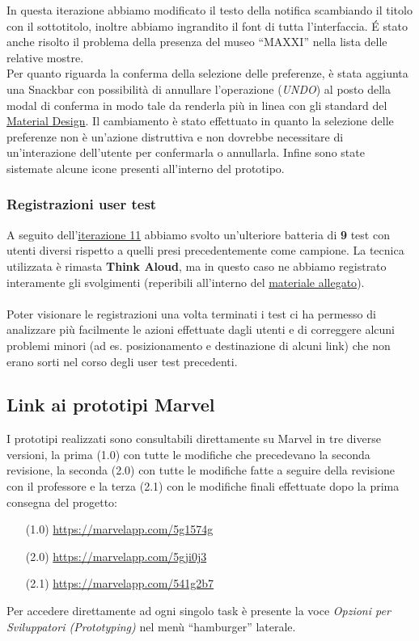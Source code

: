 In questa iterazione abbiamo modificato il testo della notifica scambiando il titolo con il sottotitolo, inoltre abbiamo ingrandito il font di tutta l'interfaccia. 
É stato anche risolto il problema della presenza del museo ``MAXXI'' nella lista delle relative mostre.\\
Per quanto riguarda la conferma della selezione delle preferenze, è stata aggiunta una Snackbar con possibilità di annullare l'operazione (\textit{UNDO}) al posto della modal di conferma in modo tale da renderla più in linea con gli standard del \href{https://material.io/components/snackbars}{Material Design}. Il cambiamento è stato effettuato in quanto la selezione delle preferenze non è un'azione distruttiva e non dovrebbe necessitare di un'interazione dell'utente per confermarla o annullarla. Infine sono state sistemate alcune icone presenti all'interno del prototipo.


\subsubsection{Registrazioni user test}
A seguito dell'\hyperref[iterazione11]{iterazione 11} abbiamo svolto un'ulteriore batteria di \textbf{9} test con utenti diversi rispetto a quelli presi precedentemente come campione. La tecnica utilizzata è rimasta \textbf{Think Aloud}, ma in questo caso ne abbiamo registrato interamente gli svolgimenti (reperibili all'interno del \href{https://github.com/andrea-gasparini/progetto-interazione-uomo-macchina/tree/master/Prototyping/Versione\%202.1/Registrazioni\%20Video}{materiale allegato}).

\paragraph{}
Poter visionare le registrazioni una volta terminati i test ci ha permesso di analizzare più facilmente le azioni effettuate dagli utenti e di correggere alcuni problemi minori (ad es. posizionamento e destinazione di alcuni link) che non erano sorti nel corso degli user test precedenti.

\subsection{Link ai prototipi Marvel}
I prototipi realizzati sono consultabili direttamente su Marvel in tre diverse versioni, la prima (1.0) con tutte le modifiche che precedevano la seconda revisione, la seconda (2.0) con tutte le modifiche fatte a seguire della revisione con il professore e la terza (2.1) con le modifiche finali effettuate dopo la prima consegna del progetto:
\begin{enumerate}
    \item[(1.0)] \url{https://marvelapp.com/5g1574g}
    \item[(2.0)] \url{https://marvelapp.com/5gji0j3}
    \item[(2.1)] \url{https://marvelapp.com/541g2b7}
\end{enumerate}

Per accedere direttamente ad ogni singolo task è presente la voce \textit{Opzioni per Sviluppatori (Prototyping)} nel menù ``hamburger'' laterale.
